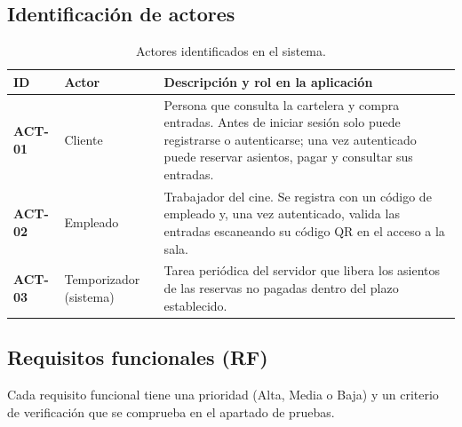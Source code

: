 \documentclass[11pt,a4paper]{article}
\begin{document}
\subsection{Identificación de actores}
\begin{table}[htbp]
\centering
\begin{tabularx}{\textwidth}{L{1.8cm} L{2.8cm} Y}
\toprule
\textbf{ID} & \textbf{Actor} & \textbf{Descripción y rol en la aplicación} \\
\midrule
\textbf{ACT-01} & Cliente & Persona que consulta la cartelera y compra entradas. Antes de iniciar sesión solo puede registrarse o autenticarse; una vez autenticado puede reservar asientos, pagar y consultar sus entradas. \\
\midrule
\textbf{ACT-02} & Empleado & Trabajador del cine. Se registra con un código de empleado y, una vez autenticado, valida las entradas escaneando su código QR en el acceso a la sala. \\
\midrule
\textbf{ACT-03} & Temporizador (sistema) & Tarea periódica del servidor que libera los asientos de las reservas no pagadas dentro del plazo establecido. \\
\bottomrule
\end{tabularx}
\caption{Actores identificados en el sistema.}
\label{tab:actores}
\end{table}

\subsection{Requisitos funcionales (RF)}
Cada requisito funcional tiene una prioridad (Alta, Media o Baja) y un criterio de verificación que se comprueba en el apartado de pruebas.
\end{document}
